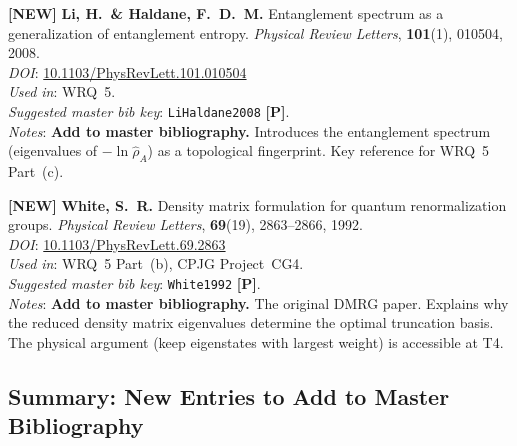 \documentclass[11pt,a4paper]{article}
\begin{document}
\begin{enumerate}[leftmargin=2em, label={\textbf{[\arabic*]}}, itemsep=10pt, resume]
\item \textbf{[NEW]}
  \textbf{Li, H.\ \& Haldane, F.~D.~M.}
  Entanglement spectrum as a generalization of entanglement entropy.
  \textit{Physical Review Letters}, \textbf{101}(1), 010504, 2008.\\
  \textit{DOI}: \href{https://doi.org/10.1103/PhysRevLett.101.010504}{10.1103/PhysRevLett.101.010504}\\
  \textit{Used in}: WRQ~5.\\
  \textit{Suggested master bib key}: \texttt{LiHaldane2008} \textbf{[P]}.\\
  \textit{Notes}: \textbf{Add to master bibliography.} Introduces the entanglement
  spectrum (eigenvalues of $-\ln\hat{\rho}_A$) as a topological fingerprint.
  Key reference for WRQ~5 Part~(c).

\item \textbf{[NEW]}
  \textbf{White, S.~R.}
  Density matrix formulation for quantum renormalization groups.
  \textit{Physical Review Letters}, \textbf{69}(19), 2863--2866, 1992.\\
  \textit{DOI}: \href{https://doi.org/10.1103/PhysRevLett.69.2863}{10.1103/PhysRevLett.69.2863}\\
  \textit{Used in}: WRQ~5 Part~(b), CPJG Project~CG4.\\
  \textit{Suggested master bib key}: \texttt{White1992} \textbf{[P]}.\\
  \textit{Notes}: \textbf{Add to master bibliography.} The original DMRG paper.
  Explains why the reduced density matrix eigenvalues determine the optimal
  truncation basis. The physical argument (keep eigenstates with largest weight)
  is accessible at T4.

\end{enumerate}

\bigskip
\subsection*{Summary: New Entries to Add to Master Bibliography}
\end{document}
